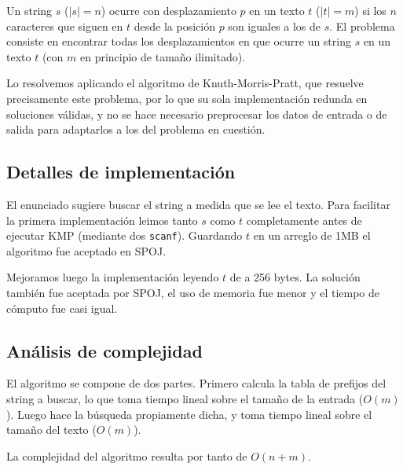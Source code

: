 Un string $s$ ($|s|=n$) ocurre con desplazamiento $p$ en un texto $t$ ($|t|=m$)
si los $n$ caracteres que siguen en $t$ desde la posición $p$ son iguales a los
de $s$. El problema consiste en encontrar todas los desplazamientos en que
ocurre un string $s$ en un texto $t$ (con $m$ en principio de tamaño ilimitado).

Lo resolvemos aplicando el algoritmo de Knuth-Morris-Pratt, que resuelve
precisamente este problema, por lo que su sola implementación redunda en
soluciones válidas, y no se hace necesario preprocesar los datos de entrada o de
salida para adaptarlos a los del problema en cuestión.

\subsection*{Detalles de implementación}

El enunciado sugiere buscar el string a medida que se lee el texto. Para
facilitar la primera implementación leimos tanto $s$ como $t$ completamente
antes de ejecutar KMP (mediante dos {\tt scanf}). Guardando $t$ en un arreglo de
1MB el algoritmo fue aceptado en SPOJ.

Mejoramos luego la implementación leyendo $t$ de a 256 bytes. La solución
también fue aceptada por SPOJ, el uso de memoria fue menor y el tiempo de
cómputo fue casi igual.

\subsection*{Análisis de complejidad}

El algoritmo se compone de dos partes. Primero calcula la tabla de prefijos del
string a buscar, lo que toma tiempo lineal sobre el tamaño de la entrada
($O(m)$). Luego hace la búsqueda propiamente dicha, y toma tiempo lineal sobre
el tamaño del texto ($O(m)$).

La complejidad del algoritmo resulta por tanto de $O(n+m)$.
